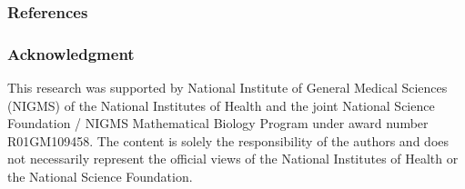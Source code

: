 \documentclass{beamer}
\newcommand{\op}{\operatorname}
\newcommand{\ind}{\stackrel{ind}{\sim}}
\begin{document}
% 
% 
% 
% 
% 

\begin{frame}[allowframebreaks]
\tiny
\frametitle{References}



\end{frame}

\begin{frame}[label=current]
\frametitle{Acknowledgment}
\small%
This research was supported by National Institute of General Medical Sciences (NIGMS) of the National Institutes of Health and the joint National Science Foundation / NIGMS Mathematical Biology Program under award number R01GM109458. The content is solely the responsibility of the authors and does not necessarily represent the official views of the National Institutes of Health or the National Science Foundation.
\end{frame}
\end{document}
